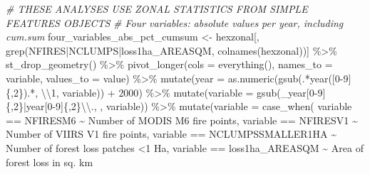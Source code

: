 \documentclass[10pt,landscape,a3paper]{article}
\newenvironment{Shaded}{\begin{snugshade}}{\end{snugshade}}
\newcommand{\AttributeTok}[1]{\textcolor[rgb]{0.77,0.63,0.00}{#1}}
\newcommand{\CommentTok}[1]{\textcolor[rgb]{0.56,0.35,0.01}{\textit{#1}}}
\newcommand{\DecValTok}[1]{\textcolor[rgb]{0.00,0.00,0.81}{#1}}
\newcommand{\FunctionTok}[1]{\textcolor[rgb]{0.00,0.00,0.00}{#1}}
\newcommand{\NormalTok}[1]{#1}
\newcommand{\OtherTok}[1]{\textcolor[rgb]{0.56,0.35,0.01}{#1}}
\newcommand{\SpecialCharTok}[1]{\textcolor[rgb]{0.00,0.00,0.00}{#1}}
\newcommand{\StringTok}[1]{\textcolor[rgb]{0.31,0.60,0.02}{#1}}
\begin{document}
\begin{Shaded}
\begin{Highlighting}[]
\CommentTok{\# THESE ANALYSES USE ZONAL STATISTICS FROM SIMPLE FEATURES OBJECTS}
\CommentTok{\# Four variables: absolute values per year, including cum.sum}
\NormalTok{four\_variables\_abs\_pct\_cumsum }\OtherTok{\textless{}{-}}\NormalTok{ hexzonal[, }\FunctionTok{grep}\NormalTok{(}\StringTok{\textquotesingle{}NFIRES|NCLUMPS|loss1ha\_AREASQM\textquotesingle{}}\NormalTok{, }\FunctionTok{colnames}\NormalTok{(hexzonal))] }\SpecialCharTok{\%\textgreater{}\%} 
  \FunctionTok{st\_drop\_geometry}\NormalTok{() }\SpecialCharTok{\%\textgreater{}\%} 
  \FunctionTok{pivot\_longer}\NormalTok{(}\AttributeTok{cols =} \FunctionTok{everything}\NormalTok{(), }\AttributeTok{names\_to =} \StringTok{\textquotesingle{}variable\textquotesingle{}}\NormalTok{, }\AttributeTok{values\_to =} \StringTok{\textquotesingle{}value\textquotesingle{}}\NormalTok{) }\SpecialCharTok{\%\textgreater{}\%} 
  \FunctionTok{mutate}\NormalTok{(}\AttributeTok{year =} \FunctionTok{as.numeric}\NormalTok{(}\FunctionTok{gsub}\NormalTok{(}\StringTok{\textquotesingle{}.*year([0{-}9]\{,2\}).*\textquotesingle{}}\NormalTok{, }\StringTok{\textquotesingle{}}\SpecialCharTok{\textbackslash{}\textbackslash{}}\StringTok{1\textquotesingle{}}\NormalTok{, variable)) }\SpecialCharTok{+} \DecValTok{2000}\NormalTok{) }\SpecialCharTok{\%\textgreater{}\%}
  \FunctionTok{mutate}\NormalTok{(}\AttributeTok{variable =} \FunctionTok{gsub}\NormalTok{(}\StringTok{\textquotesingle{}\_year[0{-}9]\{,2\}|year[0{-}9]\{,2\}}\SpecialCharTok{\textbackslash{}\textbackslash{}}\StringTok{.\textquotesingle{}}\NormalTok{, }\StringTok{\textquotesingle{}\textquotesingle{}}\NormalTok{, variable)) }\SpecialCharTok{\%\textgreater{}\%} 
  \FunctionTok{mutate}\NormalTok{(}\AttributeTok{variable =} \FunctionTok{case\_when}\NormalTok{(}
\NormalTok{    variable }\SpecialCharTok{==} \StringTok{\textquotesingle{}NFIRESM6\textquotesingle{}} \SpecialCharTok{\textasciitilde{}} \StringTok{\textquotesingle{}Number of MODIS M6 fire points\textquotesingle{}}\NormalTok{,}
\NormalTok{    variable }\SpecialCharTok{==} \StringTok{\textquotesingle{}NFIRESV1\textquotesingle{}} \SpecialCharTok{\textasciitilde{}} \StringTok{\textquotesingle{}Number of VIIRS V1 fire points\textquotesingle{}}\NormalTok{,}
\NormalTok{    variable }\SpecialCharTok{==} \StringTok{\textquotesingle{}NCLUMPSSMALLER1HA\textquotesingle{}} \SpecialCharTok{\textasciitilde{}} \StringTok{\textquotesingle{}Number of forest loss patches \textless{}1 Ha\textquotesingle{}}\NormalTok{,}
\NormalTok{    variable }\SpecialCharTok{==} \StringTok{\textquotesingle{}loss1ha\_AREASQM\textquotesingle{}} \SpecialCharTok{\textasciitilde{}} \StringTok{\textquotesingle{}Area of forest loss in sq. km\textquotesingle{}}

\end{Highlighting}
\end{Shaded}
\end{document}

